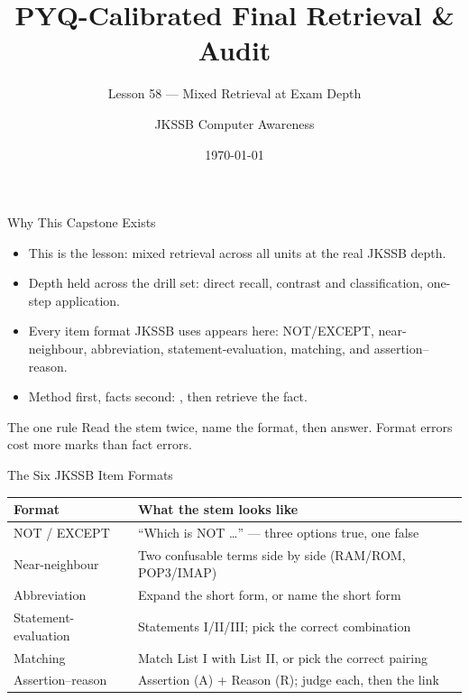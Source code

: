 \documentclass[aspectratio=169]{beamer}
\title{PYQ-Calibrated Final Retrieval \& Audit}
\subtitle{Lesson 58 --- Mixed Retrieval at Exam Depth}
\author{JKSSB Computer Awareness}
\date{\today}
\begin{document}
\frame{\titlepage}

\begin{frame}{Why This Capstone Exists}
  \begin{itemize}
    \item This is the  lesson: mixed retrieval across all units
      at the real JKSSB depth.
    \item Depth held across the drill set:  direct recall,
       contrast and classification,  one-step
      application.
    \item Every item format JKSSB uses appears here: NOT/EXCEPT,
      near-neighbour, abbreviation, statement-evaluation, matching, and
      assertion--reason.
    \item Method first, facts second: , then retrieve
      the fact.
  \end{itemize}
  \begin{block}{The one rule}
    Read the stem twice, name the format, then answer. Format errors cost
    more marks than fact errors.
  \end{block}
\end{frame}

\begin{frame}{The Six JKSSB Item Formats}
  \begin{center}
    \begin{tabular}{p{}p{}}
      \toprule
      \textbf{Format} & \textbf{What the stem looks like} \\
      \midrule
      NOT / EXCEPT & ``Which is NOT \dots'' --- three options true, one false \\
      Near-neighbour & Two confusable terms side by side (RAM/ROM, POP3/IMAP) \\
      Abbreviation & Expand the short form, or name the short form \\
      Statement-evaluation & Statements I/II/III; pick the correct combination \\
      Matching & Match List I with List II, or pick the correct pairing \\
      Assertion--reason & Assertion (A) + Reason (R); judge each, then the link \\
      \bottomrule
    \end{tabular}
  \end{center}
  \vspace{0.25cm}
\end{frame}
\end{document}
